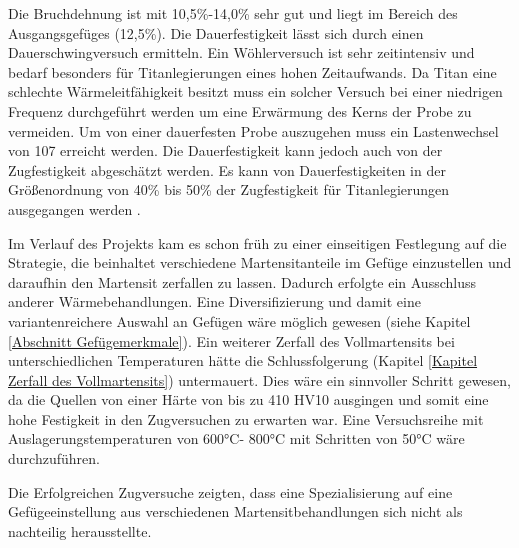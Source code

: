 \documentclass[a4paper, 11pt]{tubsreprt}
\begin{document}
Die Bruchdehnung ist mit 10,5\%-14,0\% sehr gut und liegt im Bereich des Ausgangsgefüges (12,5\%). 
Die Dauerfestigkeit lässt sich durch einen Dauerschwingversuch ermitteln. Ein Wöhlerversuch ist sehr zeitintensiv und bedarf besonders für Titanlegierungen eines hohen Zeitaufwands. Da Titan eine schlechte Wärmeleitfähigkeit besitzt muss ein solcher Versuch bei einer niedrigen Frequenz durchgeführt werden um eine Erwärmung des Kerns der Probe zu vermeiden. Um von einer dauerfesten Probe auszugehen muss ein Lastenwechsel von 107 erreicht werden.
Die Dauerfestigkeit kann jedoch auch von der Zugfestigkeit abgeschätzt werden. Es kann von Dauerfestigkeiten in der Größenordnung von 40\% bis 50\% der Zugfestigkeit für Titanlegierungen ausgegangen werden \cite{Luetjering2007}.

Im Verlauf des Projekts kam es schon früh zu einer einseitigen Festlegung auf die Strategie, die beinhaltet verschiedene Martensitanteile im Gefüge einzustellen und daraufhin den Martensit zerfallen zu lassen. Dadurch erfolgte ein Ausschluss anderer Wärmebehandlungen. Eine Diversifizierung und damit eine variantenreichere Auswahl an Gefügen wäre möglich gewesen (siehe Kapitel \ref{Abschnitt Gefügemerkmale}). 
Ein weiterer Zerfall des Vollmartensits bei unterschiedlichen Temperaturen hätte die Schlussfolgerung (Kapitel \ref{Kapitel Zerfall des Vollmartensits}) untermauert. Dies wäre ein sinnvoller Schritt gewesen, da die Quellen von einer Härte von bis zu 410 HV10 ausgingen und somit eine hohe Festigkeit in den Zugversuchen zu erwarten war. Eine Versuchsreihe mit Auslagerungstemperaturen von 600°C- 800°C mit Schritten von 50°C wäre durchzuführen.

Die Erfolgreichen Zugversuche zeigten, dass eine Spezialisierung auf eine Gefügeeinstellung aus verschiedenen Martensitbehandlungen sich nicht als nachteilig herausstellte. 



\listoffigures
\listoftables
\end{document}
